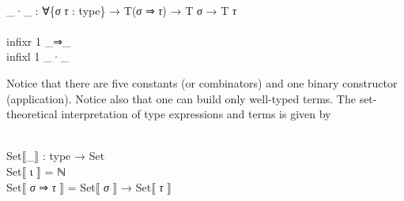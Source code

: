 \documentclass{entcs} \usepackage{prentcsmacro}
\newcommand{\AgdaFontStyle}[1]{\textsf{#1}}
\newcommand{\AgdaBoundFontStyle}[1]{\textit{#1}}
\newcommand{\AgdaKeyword}     [1]
    {\AgdaFontStyle{\textcolor{AgdaKeyword}{#1}}}
\newcommand{\AgdaNumber}      [1]{\textcolor{AgdaNumber}{#1}}
\newcommand{\AgdaSymbol}      [1]{\textcolor{AgdaSymbol}{#1}}
\newcommand{\AgdaPrimitiveType}[1]
    {\AgdaFontStyle{\textcolor{AgdaPrimitiveType}{#1}}}
\newcommand{\AgdaBound}    [1]{\AgdaBoundFontStyle{\textcolor{AgdaBound}{#1}}}
\newcommand{\AgdaInductiveConstructor}[1]
    {\AgdaFontStyle{\textcolor{AgdaInductiveConstructor}{#1}}}
\newcommand{\AgdaDatatype} [1]{\AgdaFontStyle{\textcolor{AgdaDatatype}{#1}}}
\newcommand{\AgdaFunction} [1]{\AgdaFontStyle{\textcolor{AgdaFunction}{#1}}}
\newcommand{\AgdaIndent}[1]{\quad}
\newcommand{\AgdaCodeStyle}{\small}
\newenvironment{code}%
{\noindent\AgdaCodeStyle\pboxed}%
{\endpboxed\par\noindent%
\ignorespacesafterend}
\begin{document}
\begin{code}
\\
\>[0]\AgdaIndent{2}{}\<[2]%
\>[2]\AgdaInductiveConstructor{\_·\_} \<[7]%
\>[7]\AgdaSymbol{:} \AgdaSymbol{∀\{}\AgdaBound{σ} \AgdaBound{τ} \AgdaSymbol{:} \AgdaDatatype{type}\AgdaSymbol{\}} \<[25]%
\>[25]\AgdaSymbol{→} \AgdaDatatype{T}\AgdaSymbol{(}\AgdaBound{σ} \AgdaInductiveConstructor{⇒} \AgdaBound{τ}\AgdaSymbol{)} \AgdaSymbol{→} \AgdaDatatype{T} \AgdaBound{σ} \AgdaSymbol{→} \AgdaDatatype{T} \AgdaBound{τ}\<%
\\
%
\\
\>\AgdaKeyword{infixr} \AgdaNumber{1} \_⇒\_\<%
\\
\>\AgdaKeyword{infixl} \AgdaNumber{1} \_·\_\<%
\\
\>\<\end{code}
Notice that there are five constants (or combinators) and one binary
constructor (application). Notice also that one can build only
well-typed terms.  The set-theoretical interpretation of type
expressions and terms is given by

\begin{code}\>\<%
\\
\>\AgdaFunction{Set⟦\_⟧} \AgdaSymbol{:} \AgdaDatatype{type} \AgdaSymbol{→} \AgdaPrimitiveType{Set}\<%
\\
\>\AgdaFunction{Set⟦} \AgdaInductiveConstructor{ι} \AgdaFunction{⟧} \AgdaSymbol{=} \AgdaDatatype{ℕ}\<%
\\
\>\AgdaFunction{Set⟦} \AgdaBound{σ} \AgdaInductiveConstructor{⇒} \AgdaBound{τ} \AgdaFunction{⟧} \AgdaSymbol{=} \AgdaFunction{Set⟦} \AgdaBound{σ} \AgdaFunction{⟧} \AgdaSymbol{→} \AgdaFunction{Set⟦} \AgdaBound{τ} \AgdaFunction{⟧}\<%
\\
\>\<\end{code}
\end{document}
